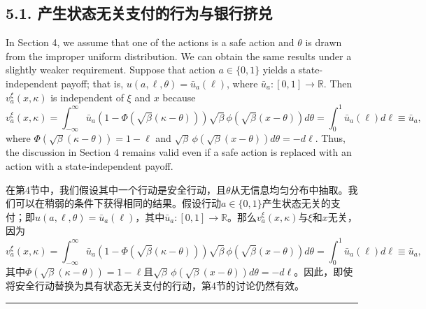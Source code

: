 \documentclass[12pt,a4paper]{article}
\newenvironment{original}
  {\par\medskip\noindent\color{black}\ignorespaces}
  {\par\medskip}
\newenvironment{translation}
  {\par\noindent\color{darkblue}\ignorespaces}
  {\par\medskip\noindent\hrule\par\medskip}
\theoremstyle{definition}
\theoremstyle{remark}
\begin{document}
\subsection*{\color{darkblue}5.1. 产生状态无关支付的行为与银行挤兑}

\begin{original}
In Section 4, we assume that one of the actions is a safe action and $\theta$ is drawn from the improper uniform distribution. We can obtain the same results under a slightly weaker requirement. Suppose that action $a \in \{0, 1\}$ yields a state-independent payoff; that is, $u(a, \ell, \theta) = \bar{u}_a(\ell)$, where $\bar{u}_a \colon [0, 1] \to \mathbb{R}$. Then $v_a^\xi(x, \kappa)$ is independent of $\xi$ and $x$ because
\[
v_a^\xi(x, \kappa) = \int_{-\infty}^{\infty} \bar{u}_a(1 - \Phi(\sqrt{\beta}(\kappa - \theta))) \sqrt{\beta}\,\phi(\sqrt{\beta}(x - \theta)) d\theta = \int_0^1 \bar{u}_a(\ell) d\ell \equiv \bar{u}_a,
\]
where $\Phi(\sqrt{\beta}(\kappa - \theta)) = 1 - \ell$ and $\sqrt{\beta}\,\phi(\sqrt{\beta}(x - \theta)) d\theta = -d\ell$. Thus, the discussion in Section 4 remains valid even if a safe action is replaced with an action with a state-independent payoff.
\end{original}
\begin{translation}
在第4节中，我们假设其中一个行动是安全行动，且$\theta$从无信息均匀分布中抽取。我们可以在稍弱的条件下获得相同的结果。假设行动$a \in \{0, 1\}$产生状态无关的支付；即$u(a, \ell, \theta) = \bar{u}_a(\ell)$，其中$\bar{u}_a \colon [0, 1] \to \mathbb{R}$。那么$v_a^\xi(x, \kappa)$与$\xi$和$x$无关，因为
\[
v_a^\xi(x, \kappa) = \int_{-\infty}^{\infty} \bar{u}_a(1 - \Phi(\sqrt{\beta}(\kappa - \theta))) \sqrt{\beta}\,\phi(\sqrt{\beta}(x - \theta)) d\theta = \int_0^1 \bar{u}_a(\ell) d\ell \equiv \bar{u}_a,
\]
其中$\Phi(\sqrt{\beta}(\kappa - \theta)) = 1 - \ell$且$\sqrt{\beta}\,\phi(\sqrt{\beta}(x - \theta)) d\theta = -d\ell$。因此，即使将安全行动替换为具有状态无关支付的行动，第4节的讨论仍然有效。
\end{translation}
\end{document}
